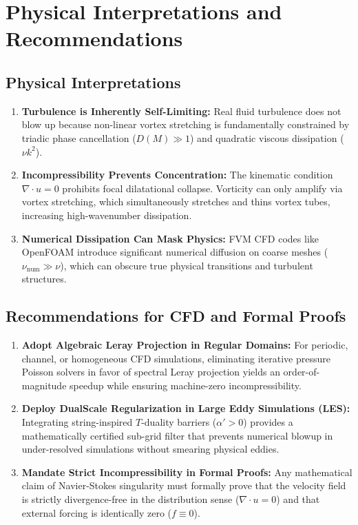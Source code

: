 \documentclass[10pt,a4paper,twocolumn]{article}
\theoremstyle{definition}
\begin{document}
\section{Physical Interpretations and Recommendations}

\subsection{Physical Interpretations}
\begin{enumerate}[leftmargin=*]
    \item \textbf{Turbulence is Inherently Self-Limiting:} Real fluid turbulence does not blow up because non-linear vortex stretching is fundamentally constrained by triadic phase cancellation ($D(M) \gg 1$) and quadratic viscous dissipation ($\nu k^2$).
    \item \textbf{Incompressibility Prevents Concentration:} The kinematic condition $\nabla \cdot u = 0$ prohibits focal dilatational collapse. Vorticity can only amplify via vortex stretching, which simultaneously stretches and thins vortex tubes, increasing high-wavenumber dissipation.
    \item \textbf{Numerical Dissipation Can Mask Physics:} FVM CFD codes like OpenFOAM introduce significant numerical diffusion on coarse meshes ($\nu_{\text{num}} \gg \nu$), which can obscure true physical transitions and turbulent structures.
\end{enumerate}

\subsection{Recommendations for CFD and Formal Proofs}
\begin{enumerate}[leftmargin=*]
    \item \textbf{Adopt Algebraic Leray Projection in Regular Domains:} For periodic, channel, or homogeneous CFD simulations, eliminating iterative pressure Poisson solvers in favor of spectral Leray projection yields an order-of-magnitude speedup while ensuring machine-zero incompressibility.
    \item \textbf{Deploy DualScale Regularization in Large Eddy Simulations (LES):} Integrating string-inspired $T$-duality barriers ($\alpha' > 0$) provides a mathematically certified sub-grid filter that prevents numerical blowup in under-resolved simulations without smearing physical eddies.
    \item \textbf{Mandate Strict Incompressibility in Formal Proofs:} Any mathematical claim of Navier-Stokes singularity must formally prove that the velocity field is strictly divergence-free in the distribution sense ($\nabla \cdot u = 0$) and that external forcing is identically zero ($f \equiv 0$).
\end{enumerate}
\end{document}
